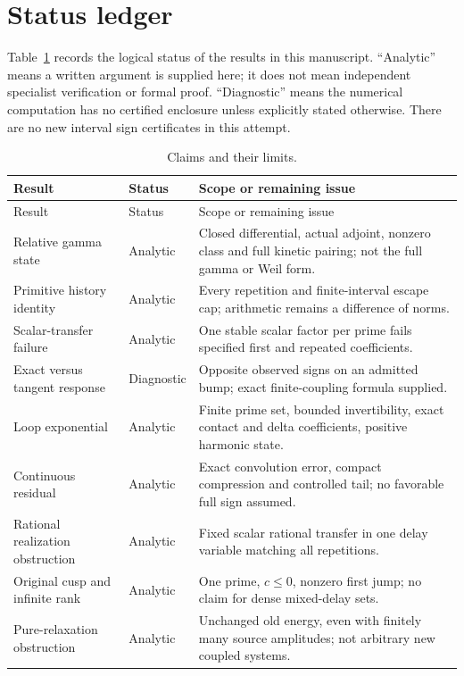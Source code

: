 \documentclass[11pt]{article}
\numberwithin{equation}{section}
\theoremstyle{definition}
\theoremstyle{remark}
\begin{document}
\section{Status ledger}
\label{app:status}
Table~\ref{tab:status} records the logical status of the results in this manuscript. ``Analytic'' means a written argument is supplied here; it does not mean independent specialist verification or formal proof. ``Diagnostic'' means the numerical computation has no certified enclosure unless explicitly stated otherwise. There are no new interval sign certificates in this attempt.
\begin{longtable}{@{}p{}p{}p{}@{}}
\caption{Claims and their limits.}\label{tab:status}\\
\toprule
Result & Status & Scope or remaining issue\\
\midrule
\endfirsthead
\toprule Result & Status & Scope or remaining issue\\\midrule
\endhead
\bottomrule\endfoot
Relative gamma state & Analytic & Closed differential, actual adjoint, nonzero class and full kinetic pairing; not the full gamma or Weil form.\\[4pt]
Primitive history identity & Analytic & Every repetition and finite-interval escape cap; arithmetic remains a difference of norms.\\[4pt]
Scalar-transfer failure & Analytic & One stable scalar factor per prime fails specified first and repeated coefficients.\\[4pt]
Exact versus tangent response & Diagnostic & Opposite observed signs on an admitted bump; exact finite-coupling formula supplied.\\[4pt]
Loop exponential & Analytic & Finite prime set, bounded invertibility, exact contact and delta coefficients, positive harmonic state.\\[4pt]
Continuous residual & Analytic & Exact convolution error, compact compression and controlled tail; no favorable full sign assumed.\\[4pt]
Rational realization obstruction & Analytic & Fixed scalar rational transfer in one delay variable matching all repetitions.\\[4pt]
Original cusp and infinite rank & Analytic & One prime, $c\le0$, nonzero first jump; no claim for dense mixed-delay sets.\\[4pt]
Pure-relaxation obstruction & Analytic & Unchanged old energy, even with finitely many source amplitudes; not arbitrary new coupled systems.\\[4pt]

\end{longtable}
\end{document}

